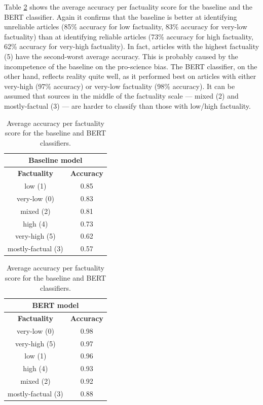 Table \ref{tab:bert_acc_bias_fact} shows the average accuracy per factuality score for the baseline and the BERT classifier. Again it confirms that the baseline is better at identifying unreliable articles (85\% accuracy for low factuality, 83\% accuracy for very-low factuality) than at identifying reliable articles (73\% accuracy for high factuality, 62\% accuracy for very-high factuality). In fact, articles with the highest factuality (5) have the second-worst average accuracy. This is probably caused by the incompetence of the baseline on the pro-science bias. The BERT classifier, on the other hand, reflects reality quite well, as it performed best on articles with either very-high (97\% accuracy) or very-low factuality (98\% accuracy). It can be assumed that sources in the middle of the factuality scale --- mixed (2) and mostly-factual (3) --- are harder to classify than those with low/high factuality.

\begin{table}[H]
    \centering
\begin{tabular}{|c|c|}
\multicolumn{2}{c}{\cellcolor[HTML]{FFCCC9}\textbf{Baseline model}} \\ \hline
\textbf{Factuality} & \textbf{Accuracy} \\ \hline
low (1)             & 0.85              \\ \hline
very-low (0)        & 0.83              \\ \hline
mixed (2)           & 0.81              \\ \hline
high (4)            & 0.73              \\ \hline
very-high (5)       & 0.62              \\ \hline
mostly-factual (3)  & 0.57              \\ \hline
\end{tabular}
\quad
\begin{tabular}{|c|c|}
\multicolumn{2}{c}{\cellcolor[HTML]{DAE8FC}\textbf{BERT model}} \\ \hline
\textbf{Factuality} & \textbf{Accuracy} \\ \hline
very-low (0)        & 0.98              \\ \hline
very-high (5)       & 0.97              \\ \hline
low (1)             & 0.96              \\ \hline
high (4)            & 0.93              \\ \hline
mixed (2)           & 0.92              \\ \hline
mostly-factual (3)  & 0.88              \\ \hline
\end{tabular}
    \caption{Average accuracy per factuality score for the baseline and BERT classifiers.}
    \label{tab:bert_acc_bias_fact}
\end{table}

